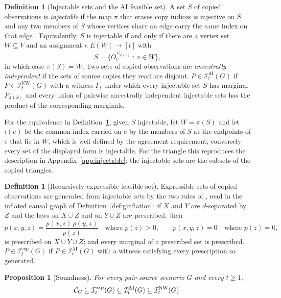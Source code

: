 \documentclass[11pt]{article}
\theoremstyle{plain}
\newtheorem{proposition}[theorem]{Proposition}
\theoremstyle{definition}
\newtheorem{definition}[theorem]{Definition}
\newcommand{\INW}{\mathcal I^{\mathrm{NW}}}
\newcommand{\IAI}{\mathcal I^{\mathrm{AI}}}
\newcommand{\Iexp}{\mathcal I^{\mathrm{exp}}}
\begin{document}
\begin{definition}[Injectable sets and the AI feasible set]\label{def:gAI}\label{def:AI}
A set $S$ of copied observations is \emph{injectable} if the map $\pi$ that erases copy indices is injective on $S$ and any two members of $S$ whose vertices share an edge carry the same index on that edge \cite[Definition~4]{WSF2019}. Equivalently, $S$ is injectable if and only if there are a vertex set $W\subseteq V$ and an assignment $\iota:E(W)\to[t]$ with
\[
S=\bigl\{O_v^{\,\iota|_{E(v)}}\ :\ v\in W\bigr\},
\]
in which case $\pi(S)=W$. Two sets of copied observations are \emph{ancestrally independent} if the sets of source copies they read are disjoint. $P\in\IAI_t(G)$ if $P\in\INW_t(G)$ with a witness $\Gamma_t$ under which every injectable set $S$ has marginal $P_{\pi(S)}$ and every union of pairwise ancestrally independent injectable sets has the product of the corresponding marginals.
\end{definition}

For the equivalence in Definition~\ref{def:gAI}, given $S$ injectable, let $W=\pi(S)$ and let $\iota(e)$ be the common index carried on $e$ by the members of $S$ at the endpoints of $e$ that lie in $W$, which is well defined by the agreement requirement; conversely every set of the displayed form is injectable. For the triangle this reproduces the description in Appendix~\ref{app:injectable}: the injectable sets are the subsets of the copied triangles.

\begin{definition}[Recursively expressible feasible set]\label{def:gexp}\label{def:exp}
Expressible sets of copied observations are generated from injectable sets by the two rules of \cite[Definition~7]{WSF2019}, read in the inflated causal graph of Definition~\ref{def:ginflation}: if $X$ and $Y$ are $d$-separated by $Z$ and the laws on $X\cup Z$ and on $Y\cup Z$ are prescribed, then
\[
p(x,y,z)=\frac{p(x,z)\,p(y,z)}{p(z)}\quad\text{where }p(z)>0,\qquad p(x,y,z)=0\quad\text{where }p(z)=0,
\]
is prescribed on $X\cup Y\cup Z$; and every marginal of a prescribed set is prescribed. $P\in\Iexp_t(G)$ if $P\in\IAI_t(G)$ with a witness satisfying every prescription so generated.
\end{definition}

\begin{proposition}[Soundness]\label{prop:gsound}
For every pair-source scenario $G$ and every $t\ge1$,
\begin{equation}\label{eq:nested}
\Cscen{G}\subseteq\Iexp_t(G)\subseteq\IAI_t(G)\subseteq\INW_t(G).
\end{equation}
\end{proposition}
\end{document}
